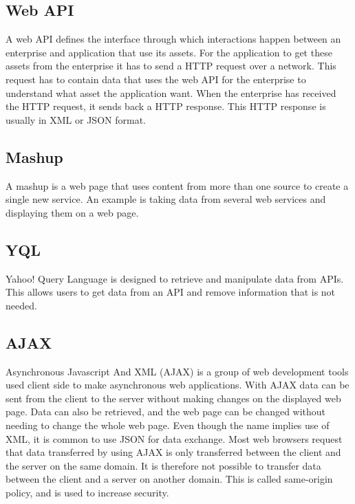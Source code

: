 \documentclass[10pt,a4paper]{article}
\begin{document}
\subsection{Web API}
A web API defines the interface through which interactions happen between an enterprise and application that use its assets. For the application to get these assets from the enterprise it has to send a HTTP request over a network. This request has to contain data that uses the web API for the enterprise to understand what asset the application want. When the enterprise has received the HTTP request, it sends back a HTTP response. This HTTP response is usually in XML or JSON format.
\subsection{Mashup}
A mashup is a web page that uses content from more than one source to create a single new service. An  example is taking data from several web services and displaying them on a web page.
\subsection{YQL}
Yahoo! Query Language is designed to retrieve and manipulate data from APIs. This allows users to get data from an API and remove information that is not needed.
\subsection{AJAX}
Asynchronous Javascript And XML (AJAX) is a group of web development tools used client side to make asynchronous web applications. With AJAX data can be sent from the client to the server without making changes on the displayed web page. Data can also be retrieved, and the web page can be changed without needing to change the whole web page. Even though the name implies use of XML, it is common to use JSON for data exchange. Most web browsers request that data transferred by using AJAX is only transferred between the client and the server on the same domain. It is therefore not possible to transfer data between the client and a server on another domain. This is called same-origin policy, and is used to increase security.
\end{document}
